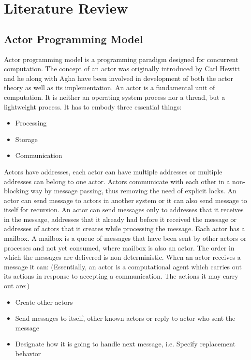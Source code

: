 \chapter{Literature Review}\label{chapter:literature_review}

\section{Actor Programming Model}
Actor programming model is a programming paradigm designed for concurrent computation. The concept of an actor was originally introduced by Carl Hewitt\cite{hewitt} and he along with Agha\cite{agha} have been involved in development of both the actor theory as well as its implementation. An actor is a fundamental unit of computation. It is neither an operating system process nor a thread, but a lightweight process. It has to embody three essential things:
\begin{itemize}
  \item Processing
  \item Storage
  \item Communication
\end{itemize}
Actors have addresses, each actor can have multiple addresses or multiple addresses can belong to one actor. Actors communicate with each other in a non-blocking way by message passing, thus removing the need of explicit locks. An actor can send message to actors in another system or it can also send message to itself for recursion. An actor can send messages only to addresses that it receives in the message, addresses that it already had before it received the message or addresses of actors that it creates while processing the message. Each actor has a mailbox. A mailbox is a queue of messages that have been sent by other actors or processes and not yet consumed, where mailbox is also an actor. The order in which the messages are delivered is non-deterministic.
When an actor receives a message it can:
(Essentially, an actor is a computational agent which carries out its actions in response to accepting a communication. The actions it may carry out are:)~\parencite{hewitt}
\begin{itemize}
  \item Create other actors
  \item Send messages to itself, other known actors or reply to actor who sent the message
  \item Designate how it is going to handle next message, i.e. Specify replacement behavior
\end{itemize}


